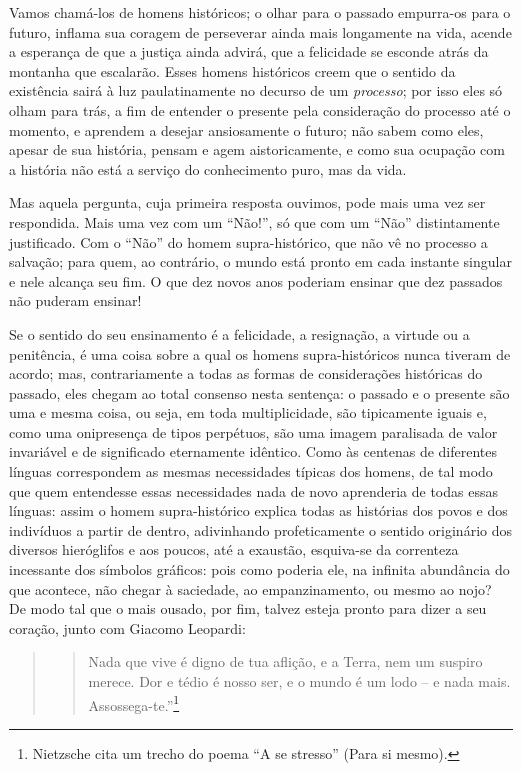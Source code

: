 Vamos chamá-los de homens históricos; o olhar para o passado empurra-os
para o futuro, inflama sua coragem de perseverar ainda mais longamente
na vida, acende a esperança de que a justiça ainda advirá, que a
felicidade se esconde atrás da montanha que escalarão. Esses homens
históricos creem que o sentido da existência sairá à luz paulatinamente
no decurso de um \emph{processo}; por isso eles só olham para trás, a
fim de entender o presente pela consideração do processo até o momento,
e aprendem a desejar ansiosamente o futuro; não sabem como eles, apesar
de sua história, pensam e agem aistoricamente, e como sua ocupação com a
história não está a serviço do conhecimento puro, mas da vida.

Mas aquela pergunta, cuja primeira resposta ouvimos, pode mais uma vez
ser respondida. Mais uma vez com um ``Não!'', só que com um ``Não''
distintamente justificado. Com o ``Não'' do homem supra-histórico, que não
vê no processo a salvação; para quem, ao contrário, o mundo está pronto
em cada instante singular e nele alcança seu fim. O que dez novos anos
poderiam ensinar que dez passados não puderam ensinar!

Se o sentido do seu ensinamento é a felicidade, a resignação, a virtude
ou a penitência, é uma coisa sobre a qual os homens supra-históricos
nunca tiveram de acordo; mas, contrariamente a todas as formas de
considerações históricas do passado, eles chegam ao total consenso nesta
sentença: o passado e o presente são uma e mesma coisa, ou seja, em toda
multiplicidade, são tipicamente iguais e, como uma onipresença de tipos
perpétuos, são uma imagem paralisada de valor invariável e de
significado eternamente idêntico. Como às centenas de diferentes línguas
correspondem as mesmas necessidades típicas dos homens, de tal modo que
quem entendesse essas necessidades nada de novo aprenderia de todas
essas línguas: assim o homem supra-histórico explica todas as histórias
dos povos e dos indivíduos a partir de dentro, adivinhando
profeticamente o sentido originário dos diversos hieróglifos e aos
poucos, até a exaustão, esquiva-se da correnteza incessante dos símbolos
gráficos: pois como poderia ele, na infinita abundância do que acontece,
não chegar à saciedade, ao empanzinamento, ou mesmo ao nojo? De modo tal
que o mais ousado, por fim, talvez esteja pronto para dizer a seu coração,
junto com Giacomo Leopardi:

\begin{quote}
\begin{verse}
Nada que vive
é digno de tua aflição, e a Terra, nem um suspiro
merece.
Dor e tédio é nosso ser, e o mundo
é um lodo -- e nada mais.
Assossega-te.''\footnote{Nietzsche cita um trecho do poema ``A se
  stresso'' (Para si mesmo).}
\end{verse}
\end{quote}

